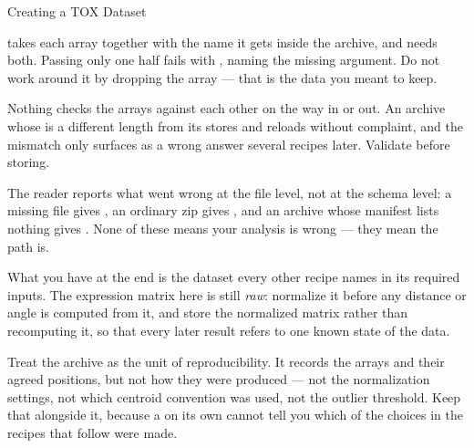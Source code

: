 \begin{recipe}[label=sub:tox-dataset]{Creating a TOX Dataset}
\begin{pitfall}
   takes each array together with the name it gets inside
  the archive, and needs both. Passing only one half fails with
  , naming the missing argument.
  Do not work around it by dropping the array --- that is the data you meant to
  keep.
\end{pitfall}

\begin{pitfall}
  Nothing checks the arrays against each other on the way in or out. An
  archive whose  is a different length from its
   stores and reloads without complaint, and the mismatch only
  surfaces as a wrong answer several recipes later. Validate before storing.
\end{pitfall}

\begin{pitfall}
  The reader reports what went wrong at the file level, not at the schema
  level: a missing file gives , an
  ordinary zip gives , and an archive
  whose manifest lists nothing gives . None of
  these means your analysis is wrong --- they mean the path is.
\end{pitfall}

\begin{interpretation}
  What you have at the end is the dataset every other recipe names in its
  required inputs. The expression matrix here is still \emph{raw}: normalize it
  before any distance or angle is computed from it, and store the normalized
  matrix rather than recomputing it, so that every later result refers to one
  known state of the data.

  Treat the archive as the unit of reproducibility. It records the arrays and
  their agreed positions, but not how they were produced --- not the
  normalization settings, not which centroid convention was used, not the
  outlier threshold. Keep that alongside it, because a  on its own
  cannot tell you which of the choices in the recipes that follow were made.
\end{interpretation}

\begin{references}
\end{references}

\end{recipe}
